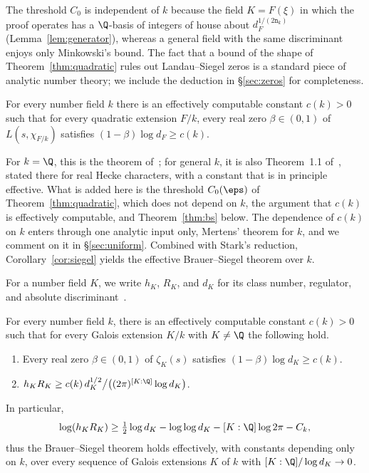 \documentclass[11pt, reqno, twoside, letterpaper]{amsart}
\newcommand{\dk}{{\mathtt{n}_k}}
\newcommand{\rou}{\xi}
\newcommand{\expC}{C}
\newcommand{\Kf}{K}
\begin{document}
The threshold $\expC_0$ is independent of $k$ because the field
$\Kf=F(\rou)$ in which the proof operates has a $\Q$-basis of integers
of
house about $d_F^{1/(2\dk)}$ (Lemma~\ref{lem:generator}), whereas a
general field with the same discriminant enjoys only Minkowski's
bound.
The fact that a bound of the shape of Theorem~\ref{thm:quadratic}
rules out
Landau--Siegel zeros is a standard piece of analytic number theory;
we include the deduction in \S\ref{sec:zeros} for completeness.

\begin{corollary}\label{cor:siegel}
For every number field $k$ there is an effectively computable
constant $c(k)>0$ such that for every quadratic extension $F/k$,
every real zero $\beta\in(0,1)$ of $L(s,\chi_{F/k})$ satisfies
$(1-\beta)\log d_F\ge c(k)$.
\end{corollary}

For $k=\Q$, this is the theorem of~\cite{OAI}; for general $k$, it
is also Theorem~1.1 of~\cite{FK}, stated there for real Hecke
characters, with a constant that is in principle effective. What is
added here is the threshold $\expC_0(\eps)$ of
Theorem~\ref{thm:quadratic}, which does not depend on $k$, the
argument that $c(k)$ is effectively computable, and
Theorem~\ref{thm:bs} below. The dependence of
$c(k)$ on $k$ enters through one analytic input only, Mertens'
theorem for $k$, and we comment on it in \S\ref{sec:uniform}.
Combined with Stark's reduction, Corollary~\ref{cor:siegel} yields
the effective Brauer--Siegel theorem over $k$.

For a number field $\Kf$, we write $h_\Kf$, $R_\Kf$, and $d_\Kf$ for
its class number,
regulator, and absolute discriminant~\cite[Chapter~I, \S\S5--7]{Ne}.

\begin{theorem}\label{thm:bs}
For every number field $k$, there is an effectively computable
constant $c(k)>0$ such that for every Galois extension $\Kf/k$ with
$\Kf\ne\Q$ the following hold.
\begin{enumerate}
\item[(i)] Every real zero $\beta\in(0,1)$ of $\zeta_\Kf(s)$
satisfies $(1-\beta)\log d_\Kf\ge c(k)$.
\item[(ii)] $h_\Kf R_\Kf\ge
c(k)\,d_\Kf^{1/2}\big/\big((2\pi)^{[\Kf:\Q]}\log d_\Kf\big)$.
\end{enumerate}
In particular,
\[
\log(h_\Kf R_\Kf)\ge\tfrac12\log d_\Kf-\log\log d_\Kf
-[\Kf:\Q]\log 2\pi-C_k,
\]
thus the Brauer--Siegel theorem holds effectively, with constants
depending only on $k$, over every sequence of Galois extensions
$\Kf$ of $k$ with $[\Kf:\Q]/\log d_\Kf\to 0$.
\end{theorem}
\end{document}
